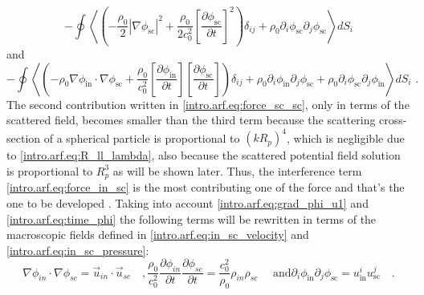\begin{equation}\label{intro.arf.eq:force_sc_sc}
    -\oint\left\langle\left(-\frac{\rho_0}{2}|\nabla\phi_{\text{sc}}|^2 + \frac{\rho_0}{2c_0^2}\left[\frac{\partial\phi_{\text{sc}}}{\partial t}\right]^2\right)\delta_{ij} + \rho_0\partial_i\phi_{\text{sc}}\partial_j\phi_{\text{sc}}\right\rangle dS_i
\end{equation}
and
\begin{equation}\label{intro.arf.eq:force_in_sc}
    -\oint\left\langle\left(-\rho_0\nabla\phi_{\text{in}}\cdot\nabla\phi_{\text{sc}} + \frac{\rho_0}{c_0^2}\left[\frac{\partial\phi_{\text{in}}}{\partial t}\right]\left[\frac{\partial\phi_{\text{sc}}}{\partial t}\right]\right)\delta_{ij} + \rho_0\partial_i\phi_{\text{in}}\partial_j\phi_{\text{sc}} + \rho_0\partial_i\phi_{\text{sc}}\partial_j\phi_{\text{in}}\right\rangle dS_i\text{ .}
\end{equation}
The second contribution written in \eqref{intro.arf.eq:force_sc_sc}, only in terms of the scattered field, becomes smaller than the third term because the scattering cross-section of a spherical particle is proportional to $(kR_p)^4$, which is negligible due to \eqref{intro.arf.eq:R_ll_lambda}, also because the scattered potential field solution is proportional to $R_p^3$ as will be shown later. Thus, the interference term \eqref{intro.arf.eq:force_in_sc} is the most contributing one of the force and that's the one to be developed \cite[~p.79]{Manneberg2009}. Taking into account \eqref{intro.arf.eq:grad_phi_u1} and \eqref{intro.arf.eq:time_phi} the following terms will be rewritten in terms of the macroscopic fields defined in \eqref{intro.arf.eq:in_sc_velocity} and \eqref{intro.arf.eq:in_sc_pressure}:
\begin{subequations}\label{intro.arf.eq:phi_fields}
\begin{equation}\label{intro.arf.eq:force_grad_vel}
    \nabla\phi_{in}\cdot\nabla\phi_{sc} = \vec u_{in}\cdot\vec u_{sc}\quad,
\end{equation}    
\begin{equation}\label{intro.arf.eq:force_phi_rho}
    \frac{\rho_0}{c_0^2}\frac{\partial\phi_{in}}{\partial t}\frac{\partial\phi_{sc}}{\partial t} = \frac{c_0^2}{\rho_0}\rho_{in}\rho_{sc}\quad\text{ and}
\end{equation}    
\begin{equation}
    \partial_i\phi_{\text{in}}\partial_j\phi_{\text{sc}} = u_{\text{in}}^{i}u_{\text{sc}}^{j}\quad.
\end{equation}
\end{subequations}
